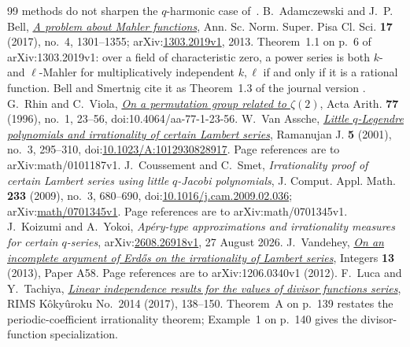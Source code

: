 \documentclass[11pt]{article}
\begin{document}
\begin{thebibliography}{99}
  methods do not sharpen the \(q\)-harmonic case of~\cite{zudilin2004}.
 B.~Adamczewski and J.~P. Bell,
  \href{https://arxiv.org/abs/1303.2019v1}{\emph{A problem about Mahler
  functions}}, Ann. Sc. Norm. Super. Pisa Cl. Sci. \textbf{17} (2017), no.~4,
  1301--1355; arXiv:\href{https://arxiv.org/abs/1303.2019v1}{1303.2019v1}, 2013.
  Theorem~1.1 on p.~6 of arXiv:1303.2019v1: over a field of characteristic
  zero, a power series is both \(k\)- and \(\ell\)-Mahler for multiplicatively
  independent \(k,\ell\) if and only if it is a rational function.  Bell and
  Smertnig cite it as Theorem~1.3 of the journal version
  \cite[Thm.~2.5, p.~5]{bellsmertnig2026}.
 G.~Rhin and C.~Viola,
  \href{https://geodesic.mathdoc.fr/articles/10.4064/aa-77-1-23-56/}
  {\emph{On a permutation group related to $\zeta(2)$}},
  Acta Arith. \textbf{77} (1996), no.~1, 23--56,
  doi:10.4064/aa-77-1-23-56.
 W.~Van Assche,
  \href{https://arxiv.org/abs/math/0101187v1}{\emph{Little \(q\)-Legendre
  polynomials and irrationality of certain Lambert series}},
  Ramanujan J. \textbf{5} (2001), no.~3, 295--310,
  doi:\href{https://doi.org/10.1023/A:1012930828917}{10.1023/A:1012930828917}.
  Page references are to arXiv:math/0101187v1.
 J.~Coussement and C.~Smet, \emph{Irrationality
  proof of certain Lambert series using little \(q\)-Jacobi polynomials},
  J. Comput. Appl. Math. \textbf{233} (2009), no.~3, 680--690,
  doi:\href{https://doi.org/10.1016/j.cam.2009.02.036}{10.1016/j.cam.2009.02.036};
  arXiv:\href{https://arxiv.org/abs/math/0701345v1}{math/0701345v1}.
  Page references are to arXiv:math/0701345v1.
 J.~Koizumi and A.~Yokoi, \emph{Ap\'ery-type
  approximations and irrationality measures for certain \(q\)-series},
  arXiv:\href{https://arxiv.org/abs/2608.26918v1}{2608.26918v1},
  27 August 2026.
 J.~Vandehey,
  \href{https://arxiv.org/abs/1206.0340v1}{\emph{On an incomplete argument of
  Erd\H{o}s on the irrationality of Lambert series}}, Integers
  \textbf{13} (2013), Paper A58. Page references are to
  arXiv:1206.0340v1 (2012).
 F.~Luca and Y.~Tachiya,
  \href{https://www.kurims.kyoto-u.ac.jp/~kyodo/kokyuroku/contents/pdf/2014-14.pdf}
  {\emph{Linear independence results for the values of divisor functions
  series}}, RIMS K\^oky\^uroku No.~2014 (2017), 138--150.
  Theorem~A on p.~139 restates the periodic-coefficient irrationality theorem;
  Example~1 on p.~140 gives the divisor-function specialization.

\end{thebibliography}
\end{document}
